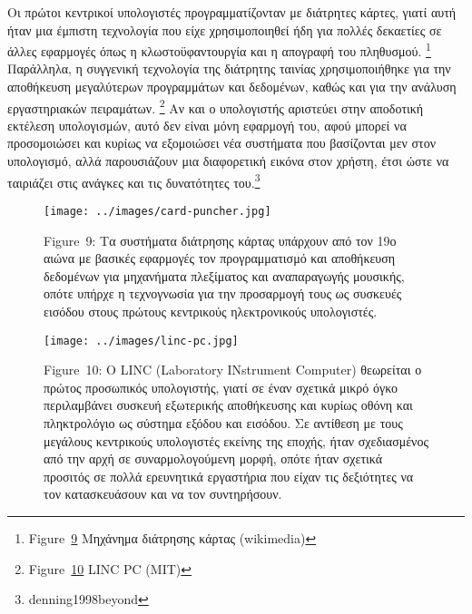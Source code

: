 \documentclass[
]{article}
\begin{document}
Οι πρώτοι κεντρικοί υπολογιστές προγραμματίζονταν με διάτρητες κάρτες,
γιατί αυτή ήταν μια έμπιστη τεχνολογία που είχε χρησιμοποιηθεί ήδη για
πολλές δεκαετίες σε άλλες εφαρμογές όπως η κλωστοϋφαντουργία και η
απογραφή του πληθυσμού. \footnote{Figure~\protect\hyperlink{fig:card-puncher}{9}
  Μηχάνημα διάτρησης κάρτας (wikimedia)} Παράλληλα, η συγγενική
τεχνολογία της διάτρητης ταινίας χρησιμοποιήθηκε για την αποθήκευση
μεγαλύτερων προγραμμάτων και δεδομένων, καθώς και για την ανάλυση
εργαστηριακών πειραμάτων. \footnote{Figure~\protect\hyperlink{fig:linc-pc}{10}
  LINC PC (MIT)} Αν και ο υπολογιστής αριστεύει στην αποδοτική εκτέλεση
υπολογισμών, αυτό δεν είναι μόνη εφαρμογή του, αφού μπορεί να
προσομοιώσει και κυρίως να εξομοιώσει νέα συστήματα που βασίζονται μεν
στον υπολογισμό, αλλά παρουσιάζουν μια διαφορετική εικόνα στον χρήστη,
έτσι ώστε να ταιριάζει στις ανάγκες και τις δυνατότητες του.\footnote{denning1998beyond}

\leavevmode{}%
\begin{figure}
\hypertarget{fig:card-puncher}{%
\centering
\texttt{[image: ../images/card-puncher.jpg]}
\caption{Figure~9: Τα συστήματα διάτρησης κάρτας υπάρχουν από τον 19ο
αιώνα με βασικές εφαρμογές τον προγραμματισμό και αποθήκευση δεδομένων
για μηχανήματα πλεξίματος και αναπαραγωγής μουσικής, οπότε υπήρχε η
τεχνογνωσία για την προσαρμογή τους ως συσκευές εισόδου στους πρώτους
κεντρικούς ηλεκτρονικούς υπολογιστές.}\label{fig:card-puncher}
}
\end{figure}

\leavevmode{}%
\begin{figure}
\hypertarget{fig:linc-pc}{%
\centering
\texttt{[image: ../images/linc-pc.jpg]}
\caption{Figure~10: O LINC (Laboratory INstrument Computer) θεωρείται ο
πρώτος προσωπικός υπολογιστής, γιατί σε έναν σχετικά μικρό όγκο
περιλαμβάνει συσκευή εξωτερικής αποθήκευσης και κυρίως οθόνη και
πληκτρολόγιο ως σύστημα εξόδου και εισόδου. Σε αντίθεση με τους μεγάλους
κεντρικούς υπολογιστές εκείνης της εποχής, ήταν σχεδιασμένος από την
αρχή σε συναρμολογούμενη μορφή, οπότε ήταν σχετικά προσιτός σε πολλά
ερευνητικά εργαστήρια που είχαν τις δεξιότητες να τον κατασκευάσουν και
να τον συντηρήσουν.}\label{fig:linc-pc}
}
\end{figure}
\end{document}

